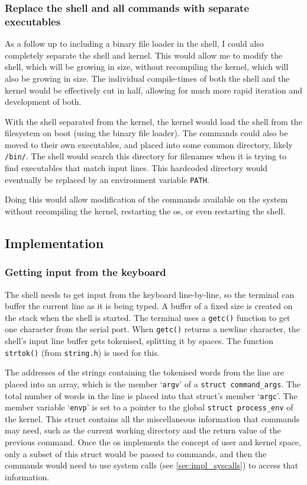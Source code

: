 \documentclass{article}
\begin{document}
\subsubsection{Replace the shell and all commands with separate executables}
As a follow up to including a binary file loader in the shell, I could also
completely separate the shell and kernel. This would allow me to modify the
shell, which will be growing in size, without recompiling the kernel, which
will also be growing in size. The individual compile-times of both the shell
and the kernel would be effectively cut in half, allowing for much more rapid
iteration and development of both.

With the shell separated from the kernel, the kernel would load the shell from
the filesystem on boot (using the binary file loader). The commands could also
be moved to their own executables, and placed into some common directory,
likely \texttt{/bin/}. The shell would search this directory for filenames when
it is trying to find executables that match input lines. This hardcoded
directory would eventually be replaced by an environment variable
\texttt{PATH}.

Doing this would allow modification of the commands available on the system
without recompiling the kernel, restarting the \gls{os}, or even restarting the
shell.


\subsection{Implementation}
\subsubsection{Getting input from the keyboard}
The shell needs to get input from the keyboard line-by-line, so the terminal
can buffer the current line as it is being typed. A buffer of a fixed size is
created on the stack when the shell is started. The terminal uses a
\texttt{getc()} function to get one character from the serial port. When
\texttt{getc()} returns a newline character, the shell's input line buffer gets
tokenised, splitting it by spaces. The function \texttt{strtok()} (from
\texttt{string.h}) is used for this.

The addresses of the strings containing the tokenised words from the line are
placed into an array, which is the member `\texttt{argv}' of a \texttt{struct
command\_args}. The total number of words in the line is placed into that
struct's member `\texttt{argc}'. The member variable `\texttt{envp}' is set to
a pointer to the global \texttt{struct process\_env} of the kernel. This struct
contains all the miscellaneous information that commands may need, such as the
current working directory and the return value of the previous command. Once
the \gls{os} implements the concept of user and kernel space, only a subset of
this struct would be passed to commands, and then the commands would need to
use system calls (see \autoref{sec:impl_syscalls}) to access that information.
\end{document}
